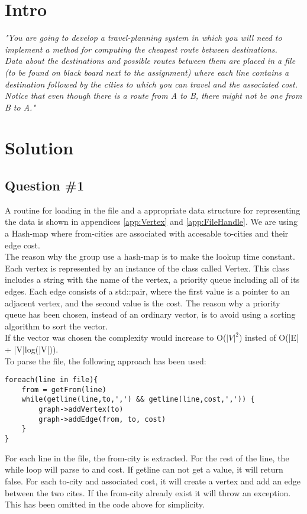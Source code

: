 \section{Intro}
\label{sec:intro}
\textit{"You are going to develop a travel-planning system in which you will need to implement a method for computing the cheapest route between destinations. \\
Data about the destinations and possible routes between them are placed in a file (to be found on black board next to the assignment) where each line contains a destination followed by the cities to which you can travel and the associated cost. \\
Notice that even though there is a route from A to B, there might not be one from B to A."}


\section{Solution}
\subsection{Question \#1}
A routine for loading in the file and a appropriate data structure for representing the data is shown in appendices  \ref{app:Vertex} and \ref{app:FileHandle}. We are using a Hash-map where from-cities are associated with accesable to-cities and their edge cost.\\
The reason why the group use a hash-map is to make the lookup time constant. \\
Each vertex is represented by an instance of the class called Vertex. This class includes a string with the name of the vertex, a priority queue including all of its edges. Each edge consists of a std::pair, where the first value is a pointer to an adjacent vertex, and the second value is the cost. 
The reason why a priority queue has been chosen, instead of an ordinary vector, is to avoid using a sorting algorithm to sort the vector.\\
If the vector was chosen the complexity would increase to O($|V|^2$) insted of O(|E| + |V|log(|V|)). \\
To parse the file, the following approach has been used:
\bigskip
\begin{lstlisting}
foreach(line in file){
	from = getFrom(line)
	while(getline(line,to,',') && getline(line,cost,',')) {
		graph->addVertex(to)
		graph->addEdge(from, to, cost)
	}	
}
\end{lstlisting}
\bigskip
For each line in the file, the from-city is extracted. For the rest of the line, the while loop will parse to and cost. If getline can not get a value, it will return false. For each to-city and associated cost, it will create a vertex and add an edge between the two cites. If the from-city already exist it will throw an exception. This has been omitted in the code above for simplicity.


